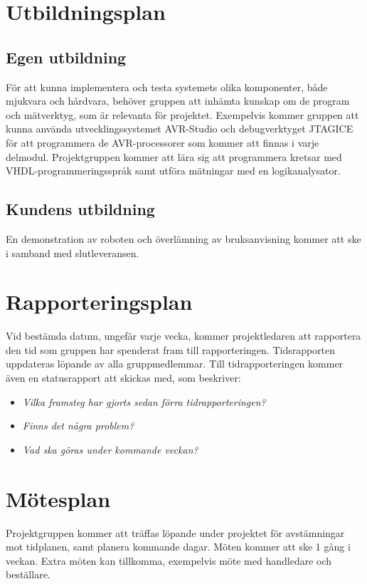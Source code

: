 \documentclass[11pt]{article}
\begin{document}
\begin{flushleft}


\section{Utbildningsplan}


\subsection{Egen utbildning}
För att kunna implementera och testa systemets olika komponenter, både mjukvara och hårdvara, behöver gruppen att inhämta kunskap om de program och mätverktyg, som är relevanta för projektet. Exempelvis kommer gruppen att kunna använda utvecklingssystemet AVR-Studio och debugverktyget JTAGICE för att programmera de AVR-processorer som kommer att finnas i varje delmodul. Projektgruppen kommer att lära sig att programmera kretsar med VHDL-programmeringsspråk samt utföra mätningar med en logikanalysator.

\subsection{Kundens utbildning}
En demonstration av roboten och överlämning av bruksanvisning kommer att ske i samband med slutleveransen.

\pagebreak

\section{Rapporteringsplan}
Vid bestämda datum, ungefär varje vecka, kommer projektledaren att rapportera den tid som gruppen har spenderat fram till rapporteringen. Tidsrapporten uppdateras löpande av alla gruppmedlemmar. Till tidrapporteringen kommer även en statusrapport att skickas med, som beskriver:\\
\begin{itemize}
	\item \textit{Vilka framsteg har gjorts sedan förra tidrapporteringen?}
	\item \textit{Finns det några problem?}
	\item \textit{Vad ska göras under kommande veckan?}
\end{itemize}

\section{Mötesplan}
Projektgruppen kommer att träffas löpande under projektet för avstämningar mot tidplanen, samt planera kommande dagar. Möten kommer att ske 1 gång i veckan. Extra möten kan tillkomma, exempelvis möte med handledare och beställare.



\end{flushleft}
\end{document}
